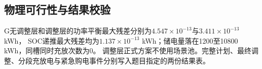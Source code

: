 \subsection{物理可行性与结果校验}
G无调整层和调整层的功率平衡最大残差分别为$4.547\times10^{-13}$与$3.411\times10^{-13}$ kWh，
SOC递推最大残差均为$1.137\times10^{-13}$ kWh；储电量落在1200至10800 kWh，同槽同时充放次数为0。
调整层正式方案不使用场景池。完整计划、最终调整、分段充放电与紧急购电事件分别写入题目指定的两份结果表。
